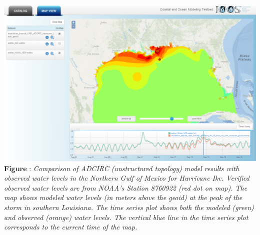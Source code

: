 \documentclass[noback,noborder,portrait,twocolumn]{cuposter}
\begin{document}
\begin{minipage}[t]{\linewidth}
  \centering
  \includegraphics[width=\linewidth]{../figs/SciWMS_ModelObsComparison}
  \textbf{Figure \getIncFigcounter{}}: \textit{Comparison of ADCIRC
    (unstructured topology) model results with observed water levels
    in the Northern Gulf of Mexico for Hurricane Ike. Verified
    observed water levels are from NOAA's Station 8760922 (red dot on
    map). The map shows modeled water levels (in meters above the
    geoid) at the peak of the storm in southern Louisiana. The time
    series plot shows both the modeled (green) and observed (orange)
    water levels. The vertical blue line in the time series plot
    corresponds to the current time of the map.}
\end{minipage}
\end{document}
